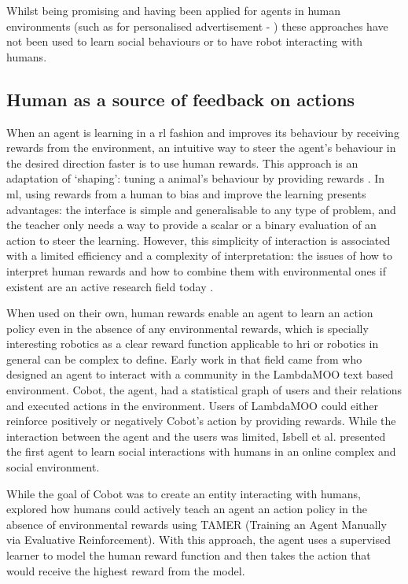 	Whilst being promising and having been applied for agents in human environments (such as for personalised advertisement - \citealt{theocharous2015personalized})	these approaches have not been used to learn social behaviours or to have robot interacting with humans.

\subsection{Human as a source of feedback on actions}

When an agent is learning in a \gls{rl} fashion and improves its behaviour by receiving rewards from the environment, an intuitive way to steer the agent's behaviour in the desired direction faster is to use human rewards. This approach is an adaptation of `shaping': tuning a animal's behaviour by providing rewards \citep{bouton2007learning}. In \gls{ml}, using rewards from a human to bias and improve the learning presents advantages: the interface is simple and generalisable to any type of problem, and the teacher only needs a way to provide a scalar or a binary evaluation of an action to steer the learning. However, this simplicity of interaction is associated with a limited efficiency and a complexity of interpretation: the issues of how to interpret human rewards and how to combine them with environmental ones if existent are an active research field today \citep{knox2010combining}.

When used on their own, human rewards enable an agent to learn an action policy even in the absence of any environmental rewards, which is specially interesting robotics as a clear reward function applicable to \gls{hri} or robotics in general can be complex to define. Early work in that field came from \cite{isbell2006cobot} who designed an agent to interact with a community in the LambdaMOO text based environment. Cobot, the agent, had a statistical graph of users and their relations and executed actions in the environment. Users of LambdaMOO could either reinforce positively or negatively Cobot's action by providing rewards. While the interaction between the agent and the users was limited, Isbell et al. presented the first agent to learn social interactions with humans in an online complex and social environment. 

While the goal of Cobot was to create an entity interacting with humans, \cite{knox2009interactively} explored how humans could actively teach an agent an action policy in the absence of environmental rewards using TAMER (Training an Agent Manually via Evaluative Reinforcement). With this approach, the agent uses a supervised learner to model the human reward function and then takes the action that would receive the highest reward from the model. 

